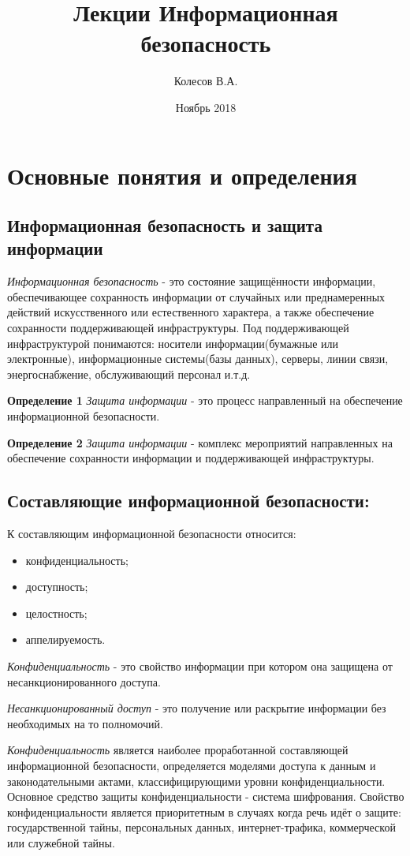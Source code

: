 \documentclass{article}
\title{Лекции Информационная безопасность}
\author{ Колесов В.А. }
\date{Ноябрь 2018}
\begin{document}
\maketitle

\newpage

\section{ Основные понятия и определения}
\subsection{ Информационная безопасность и защита информации }
\textit{Информационная безопасность} - это состояние защищённости информации, обеспечивающее
сохранность информации от случайных или преднамеренных действий искусственного или
естественного характера, а также обеспечение сохранности поддерживающей инфраструктуры. Под поддерживающей инфраструктурой понимаются: носители информации(бумажные или электронные), информационные системы(базы данных), серверы, линии связи, энергоснабжение, обслуживающий персонал и.т.д.


\textbf{Определение 1}
\textit{Защита информации} - это процесс направленный на обеспечение информационной безопасности.


\textbf{Определение 2}
\textit{Защита информации} - комплекс мероприятий направленных на обеспечение сохранности информации и поддерживающей инфраструктуры.

\subsection{Составляющие информационной безопасности:}
К составляющим информационной безопасности относится:
\begin{itemize}
\item конфиденциальность;
\item доступность;
\item целостность;
\item аппелируемость.
\end{itemize}

\textit{Конфиденциальность} - это свойство информации при котором она защищена от несанкционированного доступа.

\textit{Несанкционированный доступ} - это получение или раскрытие информации без необходимых на то полномочий.

\textit{Конфиденциальность} является наиболее проработанной составляющей информационной безопасности, определяется моделями доступа к данным и законодательными актами, классифицирующими уровни конфиденциальности. Основное средство защиты конфиденциальности - система шифрования. Свойство конфиденциальности является приоритетным в случаях когда речь идёт о защите: государственной тайны, персональных данных,  интернет-трафика, коммерческой или служебной тайны.
\end{document}
